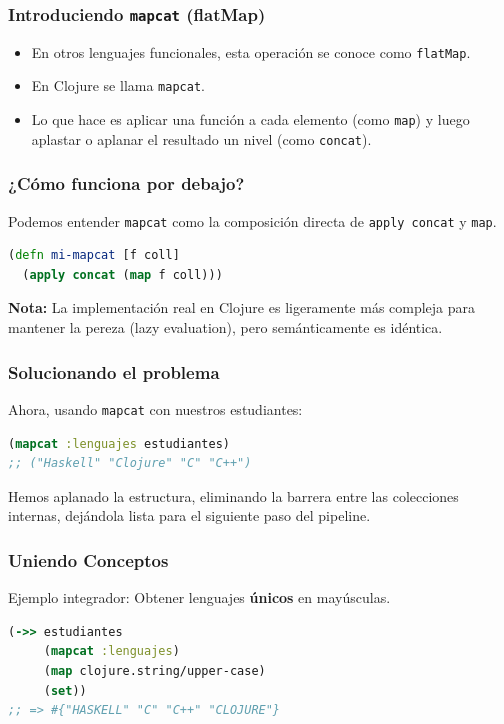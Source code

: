 \documentclass{beamer}
\begin{document}
\begin{frame}
    \frametitle{Introduciendo \texttt{mapcat} (flatMap)}
    \begin{itemize}
        \item En otros lenguajes funcionales, esta operación se conoce como \texttt{flatMap}.
        \item En Clojure se llama \texttt{mapcat}.
        \item Lo que hace es aplicar una función a cada elemento (como \texttt{map}) y luego aplastar o aplanar el resultado un nivel (como \texttt{concat}).
    \end{itemize}
\end{frame}

\begin{frame}[fragile]
    \frametitle{¿Cómo funciona por debajo?}
    Podemos entender \texttt{mapcat} como la composición directa de \texttt{apply concat} y \texttt{map}.
    \begin{lstlisting}[language=Clojure]
(defn mi-mapcat [f coll]
  (apply concat (map f coll)))
    \end{lstlisting}
    \vspace{0.5cm}
    \textbf{Nota:} La implementación real en Clojure es ligeramente más compleja para mantener la pereza (lazy evaluation), pero semánticamente es idéntica.
\end{frame}

\begin{frame}[fragile]
    \frametitle{Solucionando el problema}
    Ahora, usando \texttt{mapcat} con nuestros estudiantes:
    \begin{lstlisting}[language=Clojure]
(mapcat :lenguajes estudiantes)
;; ("Haskell" "Clojure" "C" "C++")
    \end{lstlisting}
    Hemos aplanado la estructura, eliminando la barrera entre las colecciones internas, dejándola lista para el siguiente paso del pipeline.
\end{frame}

\begin{frame}[fragile]
    \frametitle{Uniendo Conceptos}
    Ejemplo integrador: Obtener lenguajes \textbf{únicos} en mayúsculas.
    \begin{lstlisting}[language=Clojure]
(->> estudiantes
     (mapcat :lenguajes)
     (map clojure.string/upper-case)
     (set)) 
;; => #{"HASKELL" "C" "C++" "CLOJURE"}
    \end{lstlisting}
\end{frame}
\end{document}
